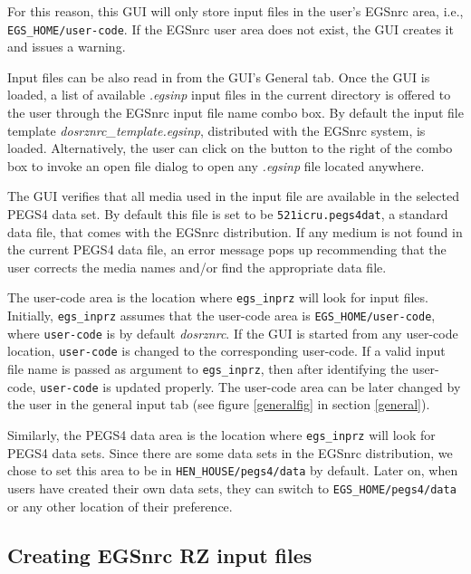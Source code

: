 \documentclass[12pt,twoside]{article}   %
\begin{document}
For this reason, this GUI will only store input files in the user's EGSnrc
area, i.e., {\tt EGS\_HOME/user-code}. If the EGSnrc user area does not exist,
the GUI creates it and issues a warning.

Input files can be also read in from the GUI's General tab. Once the GUI is loaded,
a list of available {\em *.egsinp} input files in the current directory is offered
to the user through the EGSnrc input file name combo box. By default the input file
template {\em dosrznrc\_template.egsinp}, distributed with the EGSnrc system, is loaded.
Alternatively, the user can click on the button to the right of the combo box to
invoke an open file dialog to open any {\em *.egsinp} file located anywhere.

The GUI verifies that all media used in the input file are available in the selected
PEGS4 data set. By default this file is set to be {\tt 521icru.pegs4dat}, a standard data
file, that comes with the EGSnrc distribution. If any medium is not found in the
current PEGS4 data file, an error message pops up recommending that the user corrects the
media names and/or find the appropriate data file.

The user-code area is the location where {\tt egs\_inprz} will look for input files. Initially,
{\tt egs\_inprz} assumes that the user-code area is {\tt EGS\_HOME/user-code}, where {\tt user-code}
is by default {\em dosrznrc}. If the GUI is started from any user-code location, {\tt user-code}
is changed to the corresponding user-code. If a valid input file name is passed as argument to
{\tt egs\_inprz}, then after identifying the user-code, {\tt user-code} is updated properly.
The user-code area can
be later changed by the user in the general input tab (see figure \ref{generalfig} in section
\ref{general}).

Similarly, the PEGS4 data area is the location where {\tt egs\_inprz} will look for PEGS4 data sets.
Since
there are some data sets in the EGSnrc distribution, we chose to set this area to be in
{\tt HEN\_HOUSE/pegs4/data} by default. Later on, when users have created their own data sets, they
can switch to {\tt EGS\_HOME/pegs4/data} or any other location of their preference.


\subsection{Creating EGSnrc RZ input files}
\label{creating }
\end{document}
